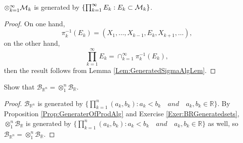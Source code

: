 \begin{prop}
    \label{Prop:GeneraterOfProdAlg}
    $\otimes_{k=1}^{\infty}\mathcal{M}_{k}$ is generated by 
    $\{\prod_{k=1}^{\infty}E_{k}:E_{k}\subset\mathcal{M}_{k}\}$.
\end{prop}
\begin{proof}
    On one hand, 
    \begin{displaymath}
    \pi_{k}^{-1}(E_{k})=(X_{1},\ldots,X_{k-1},E_{k},X_{k+1},\ldots), 
    \end{displaymath}
    on the other hand, 
    \begin{displaymath}
        \prod_{k=1}^{\infty}E_{k}=\cap_{k=1}^{\infty}\pi_{k}^{-1}(E_k),
    \end{displaymath}
    then the 
    result follows from 
    Lemma \ref{Lem:GeneratedSigmaAlgLem}.
\end{proof}
\begin{exc}
    Show that $\mathcal{B}_{\mathbb{R}^n}
    =\otimes_{1}^{n}\mathcal{B}_{\mathbb{R}}$.
\end{exc}
\begin{proof}
    $\mathcal{B}_{\mathbb{R}^n}$ is generated by  $\{\prod_{k=1}^{n}(a_k,b_k):a_k<b_k \quad and \quad a_k,b_k\in\mathbb{R}\}$.
    By Proposition \ref{Prop:GeneraterOfProdAlg} and Exercise \ref{Exer:BRGeneratedsets},
    $\otimes_{1}^{n}\mathcal{B}_{\mathbb{R}}$ is generated by $\{\prod_{k=1}^{n}(a_k,b_k):a_k<b_k \quad and \quad a_k,b_k\in\mathbb{R}\}$ as well,
    so $\mathcal{B}_{\mathbb{R}^n}=\otimes_{1}^{n}\mathcal{B}_{\mathbb{R}}$.
\end{proof}

